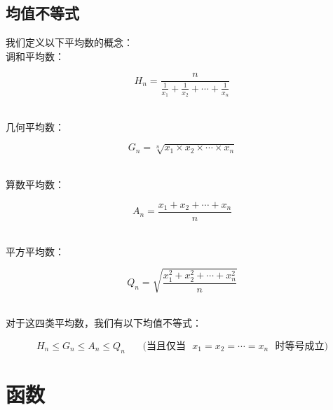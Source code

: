 \documentclass[UTF8]{ctexart}
\begin{document}
\subsection{均值不等式}
    我们定义以下平均数的概念：\\[3mm]
    调和平均数：
    \begin{large}
        \begin{equation*}
            H_n=\frac{n}{\frac{1}{x_1}+\frac{1}{x_2}+\cdots+\frac{1}{x_n}}
        \end{equation*}
    \end{large}\\
    几何平均数：
    \begin{large}
        \begin{equation*}
            G_n=\sqrt[n]{x_1\times x_2\times \cdots \times x_n}
        \end{equation*}
    \end{large}\\
    算数平均数：
    \begin{large}
        \begin{equation*}
            A_n=\frac{x_1+x_2+\cdots+x_n}{n}
        \end{equation*}
    \end{large}\\
    平方平均数：
    \begin{large}
        \begin{equation*}
            Q_n=\sqrt{\frac{x_1^2+x_2^2+\cdots+x_n^2}{n}}
        \end{equation*}
    \end{large}\\[2mm]
    对于这四类平均数，我们有以下均值不等式：
    \begin{large}
        \begin{equation*}
            H_n\le G_n\le A_n\le Q_n~~~~~~~~\text{(当且仅当~~}x_1=x_2=\cdots=x_n\text{~~时等号成立)}
        \end{equation*}
    \end{large}

\newpage

\section{函数}
\end{document}
